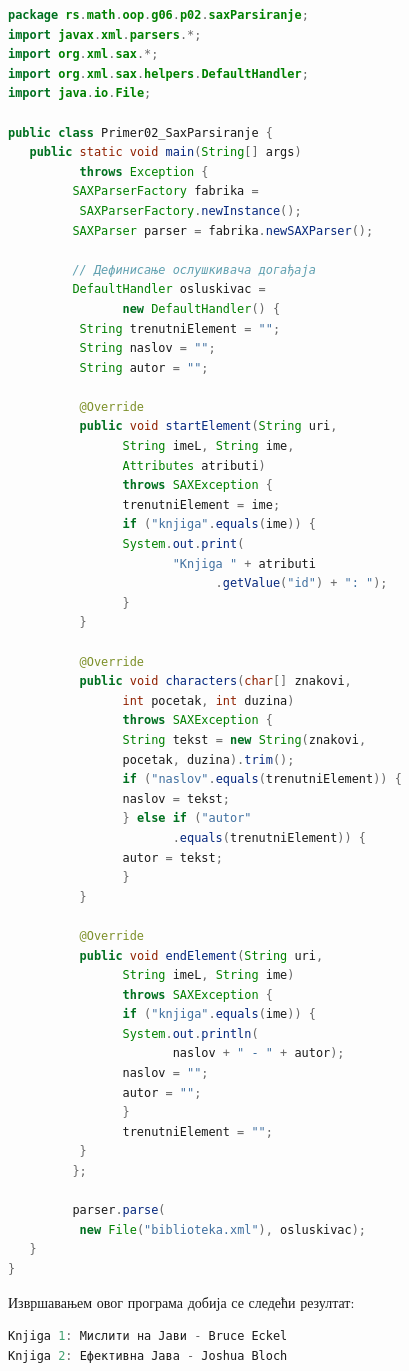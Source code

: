 \begin{lstlisting}[language=Java]
package rs.math.oop.g06.p02.saxParsiranje;
import javax.xml.parsers.*;
import org.xml.sax.*;
import org.xml.sax.helpers.DefaultHandler;
import java.io.File;
 
public class Primer02_SaxParsiranje {
   public static void main(String[] args)
          throws Exception {
         SAXParserFactory fabrika =
          SAXParserFactory.newInstance();
         SAXParser parser = fabrika.newSAXParser();
 
         // Дефинисање ослушкивача догађаја
         DefaultHandler osluskivac =
                new DefaultHandler() {
          String trenutniElement = "";
          String naslov = "";
          String autor = "";
 
          @Override
          public void startElement(String uri,
                String imeL, String ime,
                Attributes atributi)
                throws SAXException {
                trenutniElement = ime;
                if ("knjiga".equals(ime)) {
                System.out.print(
                       "Knjiga " + atributi
                             .getValue("id") + ": ");
                }
          }
 
          @Override
          public void characters(char[] znakovi,
                int pocetak, int duzina)
                throws SAXException {
                String tekst = new String(znakovi,
                pocetak, duzina).trim();
                if ("naslov".equals(trenutniElement)) {
                naslov = tekst;
                } else if ("autor"
                       .equals(trenutniElement)) {
                autor = tekst;
                }
          }
 
          @Override
          public void endElement(String uri,
                String imeL, String ime)
                throws SAXException {
                if ("knjiga".equals(ime)) {
                System.out.println(
                       naslov + " - " + autor);
                naslov = "";
                autor = "";
                }
                trenutniElement = "";
          }
         };
 
         parser.parse(
          new File("biblioteka.xml"), osluskivac);
   }
}
\end{lstlisting}


Извршавањем овог програма добија се следећи резултат:


\begin{lstlisting}[language=Java]
Knjiga 1: Мислити на Јави - Bruce Eckel
Knjiga 2: Ефективна Јава - Joshua Bloch
\end{lstlisting}


